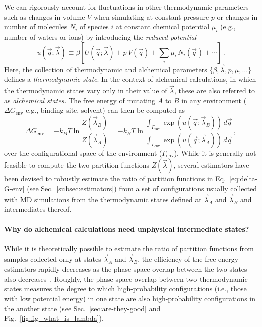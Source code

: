 \documentclass[9pt,bestpractices]{livecoms}
\begin{document}
We can rigorously account for fluctuations in other thermodynamic parameters such as changes in volume $V$ when simulating at constant pressure $p$ or changes in number of molecules $N_i$ of species $i$ at constant chemical potential $\mu_i$ (e.g., number of waters or ions) by introducing the \textit{reduced potential}~\cite{shirts2008statisticallya}
\begin{equation}\label{eq:reduced-potential}
u(\vec{q};\vec{\lambda}) \equiv \beta \left[ U(\vec{q};\vec{\lambda}) + p \, V(\vec{q}) + \sum_i \mu_i \, N_i(\vec{q}) + \cdots \right] \, .
\end{equation}
Here, the collection of thermodynamic and alchemical parameters $\{\beta, \vec{\lambda}, p, \mu, \ldots\}$ defines a \emph{thermodynamic state}.
In the context of alchemical calculations, in which the thermodynamic states vary only in their value of $\vec{\lambda}$, these are also referred to as \emph{alchemical states}.
The free energy of mutating $A$ to $B$ in any environment ($\Delta G_{\mathrm{env}}$ e.g., binding site, solvent) can then be computed as
\begin{equation}\label{eq:delta-G-env}
    \Delta G_{\mathrm{env}} = - k_BT \ln \frac{Z(\vec{\lambda}_B)}{Z(\vec{\lambda}_A)} = - k_BT \ln \frac{\int_{\Gamma_{\mathrm{env}}} \exp\left( u(\vec{q}; \vec{\lambda}_B) \right) \, d\vec{q}}{\int_{\Gamma_{\mathrm{env}}} \exp\left( u(\vec{q}; \vec{\lambda}_A) \right) \, d\vec{q}} \, ,
\end{equation}
over the configurational space of the environment ($\Gamma_{\mathrm{env}}$).
While it is generally not feasible to compute the two partition functions $Z(\vec{\lambda})$, several estimators have been devised to robustly estimate the ratio of partition functions in Eq.~\ref{eq:delta-G-env} (see Sec.~\ref{subsec:estimators}) from a set of configurations usually collected with MD simulations from the thermodynamic states defined at $\vec{\lambda}_A$ and $\vec{\lambda}_B$ and intermediates thereof.

\paragraph{Why do alchemical calculations need unphysical intermediate states?}
While it is theoretically possible to estimate the ratio of partition functions from samples collected only at states $\vec{\lambda}_A$ and $\vec{\lambda}_B$, the efficiency of the free energy estimators rapidly decreases as the phase-space overlap between the two states also decreases~\cite{wu2005phasespace, wu2005phasespacea}.
Roughly, the phase-space overlap between two thermodynamic states measures the degree to which high-probability configurations (i.e., those with low potential energy) in one state are also high-probability configurations in the another state (see Sec.~\ref{sec:are-they-good} and Fig.~\ref{fig:fig_what_is_lambda}).
\end{document}
